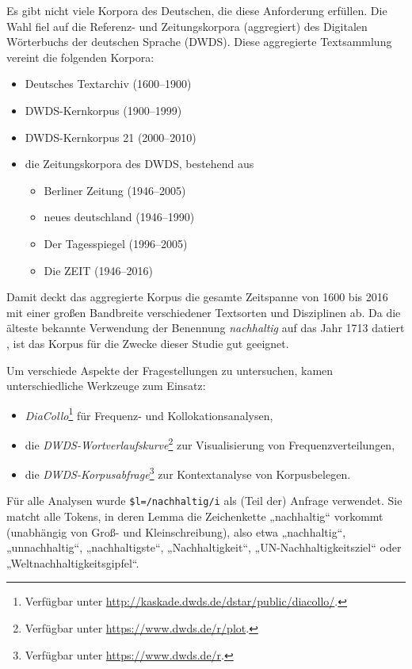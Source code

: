 \documentclass[
    german,
    a4paper,%
    12pt,%
    oneside,%
    toc=bibliography,
    final,
]{scrartcl}
\begin{document}
Es gibt nicht viele Korpora des Deutschen, die diese Anforderung erfüllen. Die Wahl fiel auf die Referenz- und Zeitungskorpora (aggregiert) des Digitalen Wörterbuchs der deutschen Sprache (DWDS). Diese aggregierte Textsammlung vereint die folgenden Korpora:

\begin{itemize}
\item Deutsches Textarchiv (1600–1900) \citep[vgl.][]{Geyken2011}
\item DWDS-Kernkorpus (1900–1999) \citep[vgl.][]{Geyken2007}
\item DWDS-Kernkorpus 21 (2000–2010) \citep[vgl.][]{Geyken2007}
\item die Zeitungskorpora des DWDS, bestehend aus
	\begin{itemize}
	\item Berliner Zeitung (1946–2005)
	\item neues deutschland (1946–1990)
	\item Der Tagesspiegel (1996–2005)
	\item Die ZEIT (1946–2016)
	\end{itemize}
\end{itemize}

Damit deckt das aggregierte Korpus die gesamte Zeitspanne von 1600 bis 2016 mit einer großen Bandbreite verschiedener Textsorten und Disziplinen ab. Da die älteste bekannte Verwendung der Benennung \textit{nachhaltig} auf das Jahr 1713 datiert \citep[vgl.][99]{Zürcher1965}, ist das Korpus für die Zwecke dieser Studie gut geeignet.

Um verschiede Aspekte der Fragestellungen zu untersuchen, kamen unterschiedliche Werkzeuge zum Einsatz:

\begin{itemize}
\item \textit{DiaCollo}\footnote{Verfügbar unter \url{http://kaskade.dwds.de/dstar/public/diacollo/}.} \citep{Jurish2015} für Frequenz- und Kollokationsanalysen,
\item die \textit{DWDS-Wortverlaufskurve}\footnote{Verfügbar unter \url{https://www.dwds.de/r/plot}.} zur Visualisierung von Frequenzverteilungen,
\item die \textit{DWDS-Korpusabfrage}\footnote{Verfügbar unter \url{https://www.dwds.de/r}.} zur Kontextanalyse von Korpusbelegen.
\end{itemize}

Für alle Analysen wurde \lstinline|$l=/nachhaltig/i| als (Teil der) Anfrage verwendet. Sie matcht alle Tokens, in deren Lemma die Zeichenkette „nachhaltig“ vorkommt (unabhängig von Groß- und Kleinschreibung), also etwa „nachhaltig“, „unnachhaltig“, „nachhaltigste“, „Nachhaltigkeit“, „UN-Nachhaltigkeitsziel“ oder „Weltnachhaltigkeitsgipfel“.
\end{document}
